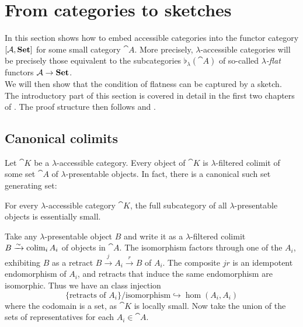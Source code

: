 \section{From categories to sketches}
\label{seq:catstoskeches}

In this section shows how to embed accessible categories into the functor category $[\mathcal{A},\mathbf{Set}]$ for some small category $\cat A$. More precisely, $\lambda$-accessible categories will be precisely those equivalent to the subcategories $\flat_\lambda(\cat A)$ of so-called \emph{$\lambda$-flat} functors $\mathcal{A} \to \mathbf{Set}$. \\

We will then show that the condition of flatness can be captured by a sketch. \\

The introductory part of this section is covered in detail in the first two chapters of \cite{AdamekRosicky}. The proof structure then follows \cite[Chapter 2]{MakkaiPare} and \cite[D2.3]{elephant}.

\subsection{Canonical colimits}

Let $\cat K$ be a $\lambda$-accessible category. Every object of $\cat K$ is $\lambda$-filtered colimit of some set $\cat A$ of $\lambda$-presentable objects. In fact, there is a canonical such set generating set:

\begin{Proposition}
For every $\lambda$-accessible category $\cat K$, the full subcategory of all $\lambda$-presentable objects is essentially small. 
\end{Proposition}
\begin{Proof}
Take any $\lambda$-presentable object $B$ and write it as a $\lambda$-filtered colimit $B \xrightarrow{\sim} \operatorname{colim}_i A_i$ of objects in $\cat A$. The isomorphism factors through one of the $A_i$, exhibiting $B$ as a retract $B \xrightarrow{j} A_i \xrightarrow{r} B$ of $A_i$. The composite $jr$ is an idempotent endomorphism of $A_i$, and retracts that induce the same endomorphism are isomorphic. Thus we have an class injection
\[ \{ \text{retracts of } A_i \}/\text{isomorphism} \hookrightarrow \hom(A_i,A_i) \]
where the codomain is a set, as $\cat K$ is locally small. Now take the union of the sets of representatives for each $A_i \in \cat A$.
\end{Proof}

